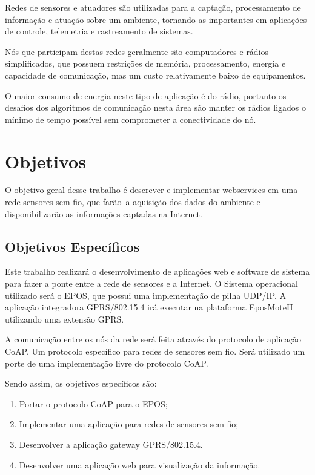 Redes de sensores e atuadores s\~ao utilizadas para a capta\c{c}\~ao, processamento de informa\c{c}\~ao e atua\c{c}\~ao sobre um ambiente, tornando-as importantes em aplica\c{c}\~oes de controle, telemetria e rastreamento de sistemas.

N\'os que participam destas redes geralmente s\~ao computadores e r\'adios simplificados, que possuem restri\c{c}\~oes de mem\'oria, processamento, energia e capacidade de comunica\c{c}\~ao, mas um custo relativamente baixo de equipamentos.

O maior consumo de energia neste tipo de aplica\c{c}\~ao \'e do r\'adio, portanto os desafios dos algoritmos de comunica\c{c}\~ao nesta \'area s\~ao manter os r\'adios ligados o m\'inimo de tempo poss\'ivel sem comprometer a conectividade do n\'o.

\section{Objetivos}
O objetivo geral desse trabalho \'e descrever e implementar webservices em uma rede sensores sem fio, que far\~ao\
a aquisi\c{c}\~ao dos dados do ambiente e disponibilizar\~ao as informa\c{c}\~oes captadas na Internet.

\subsection{Objetivos Espec\'ificos}
Este trabalho realizar\'a o desenvolvimento de aplica\c{c}\~oes web e software de sistema para fazer a ponte entre a rede de sensores e a Internet. O Sistema operacional utilizado ser\'a o EPOS, que possui uma implementa\c{c}\~ao de pilha UDP/IP. A aplica\c{c}\~ao integradora GPRS/802.15.4 ir\'a executar na plataforma EposMoteII utilizando uma extens\~ao GPRS.

A comunica\c{c}\~ao entre os n\'os da rede ser\'a feita atrav\'es do protocolo de aplica\c{c}\~ao CoAP. Um protocolo espec\'ifico para redes de sensores sem fio. Ser\'a utilizado um porte de uma implementa\c{c}\~ao livre do protocolo CoAP.

Sendo assim, os objetivos espec\'ificos s\~ao:

\begin{enumerate}
    \item Portar o protocolo CoAP para o EPOS;
    \item Implementar uma aplica\c{c}\~ao para redes de sensores sem fio;
    \item Desenvolver a aplica\c{c}\~ao gateway GPRS/802.15.4.
    \item Desenvolver uma aplica\c{c}\~ao web para visualiza\c{c}\~ao da informa\c{c}\~ao.
\end{enumerate}

